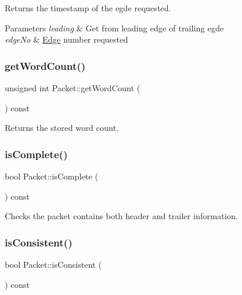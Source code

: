 Returns the timestamp of the egde requested. 


\begin{DoxyParams}{Parameters}
{\em leading} & Get from leading edge of trailing egde \\
\hline
{\em edge\+No} & \hyperlink{class_edge}{Edge} number requested \\
\hline
\end{DoxyParams}
\mbox{\label{class_packet_aaa356da77eccb505207544c8034c1356}} 
\subsubsection{\texorpdfstring{get\+Word\+Count()}{getWordCount()}}
{\footnotesize\ttfamily unsigned int Packet\+::get\+Word\+Count (\begin{DoxyParamCaption}{ }\end{DoxyParamCaption}) const\hspace{0.3cm}{\ttfamily [inline]}}



Returns the stored word count. 

\mbox{\label{class_packet_a6b5ce354c03663c98cccd31ad9a6f5ff}} 
\subsubsection{\texorpdfstring{is\+Complete()}{isComplete()}}
{\footnotesize\ttfamily bool Packet\+::is\+Complete (\begin{DoxyParamCaption}{ }\end{DoxyParamCaption}) const}



Checks the packet contains both header and trailer information. 

\mbox{\label{class_packet_a8d9e544f6f56389fa13bb01b2d37ca58}} 
\subsubsection{\texorpdfstring{is\+Consistent()}{isConsistent()}}
{\footnotesize\ttfamily bool Packet\+::is\+Consistent (\begin{DoxyParamCaption}{ }\end{DoxyParamCaption}) const}



